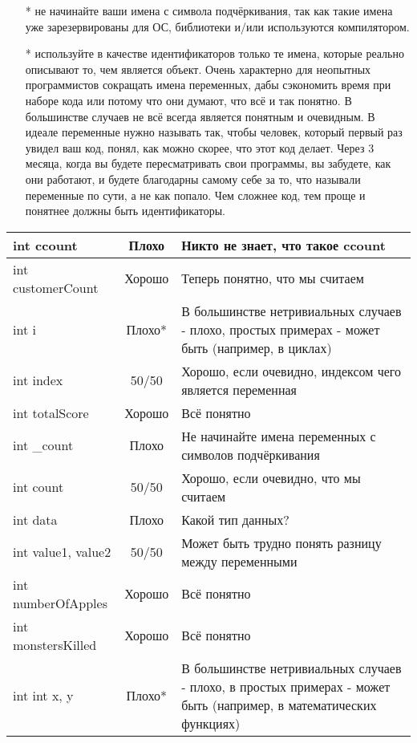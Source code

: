 \documentclass[a4paper,16pt]{report} %
\begin{document}
\begin{itemize}
	\item[*] не начинайте ваши имена с символа подчёркивания, так как такие имена уже зарезервированы для ОС, библиотеки и/или используются компилятором.
	\item[*] используйте в качестве идентификаторов только те имена, которые реально описывают то, чем является объект. Очень характерно для неопытных программистов сокращать имена переменных, дабы сэкономить время при наборе кода или потому что они думают, что всё и так понятно. В большинстве случаев не всё всегда является понятным и очевидным. В идеале переменные нужно называть так, чтобы человек, который первый раз увидел ваш код, понял, как можно скорее, что этот код делает. Через 3 месяца, когда вы будете пересматривать свои программы, вы забудете, как они работают, и будете благодарны самому себе за то, что называли переменные по сути, а не как попало. Чем сложнее код, тем проще и понятнее должны быть идентификаторы.
\end{itemize}
\begin{tabular}{ | l | c | >{\raggedright\arraybackslash}p{}| } %
	\hline
	int ccount & Плохо & Никто не знает, что такое ccount  \\ \hline %
	int customerCount & Хорошо & Теперь понятно, что мы считаем \\ \hline
	int i & Плохо* & В большинстве нетривиальных случаев - плохо, 
	простых примерах - может быть (например, в циклах) \\ \hline
	int index & 50/50 & Хорошо, если очевидно, индексом чего является переменная\\ \hline
	int totalScore & Хорошо & Всё понятно \\ \hline
	int \_count & Плохо & Не начинайте имена переменных с символов подчёркивания\\ \hline
	int count & 50/50 & Хорошо, если очевидно, что мы считаем \\ \hline
	int data & Плохо & Какой тип данных? \\ \hline
	int value1, value2 & 50/50 & Может быть трудно понять разницу между переменными \\ \hline
	int numberOfApples & Хорошо & Всё понятно \\ \hline
	int monstersKilled & Хорошо & Всё понятно \\ \hline
	int int x, y & Плохо* & В большинстве нетривиальных случаев - плохо, 
	в простых примерах - может быть (например, в математических функциях) \\ \hline
\end{tabular}
\end{document}
